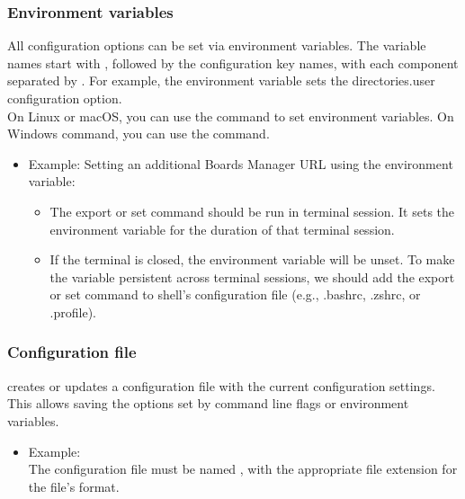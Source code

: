 \subsubsection{Environment variables}
All configuration options can be set via environment variables. The variable names start with , followed by the configuration key names, with each component separated by \SHELL{\_}. For example, the  environment variable sets the directories.user configuration option.
\\On Linux or macOS, you can use the  command to set environment variables. On Windows command, you can use the  command. \cite{ArduinoCLIConfig:2024}
\begin{itemize}
	\item Example:
Setting an additional Boards Manager URL using the  environment variable:
\newline
{}
\newline
{}

	\begin{itemize}
		\item The export or set command should be run in terminal session. It sets the environment variable for the duration of that terminal session.
		\item If the terminal is closed, the environment variable will be unset. To make the variable persistent across terminal sessions, we should add the export or set command to shell's configuration file (e.g., .bashrc, .zshrc, or .profile).
	\end{itemize}
\end{itemize}

\subsubsection{Configuration file}
 creates or updates a configuration file with the current configuration settings.
This allows saving the options set by command line flags or environment variables. \cite{ArduinoCLIConfig:2024}
\begin{itemize}
	\item Example:
\newline
{}
\\The configuration file must be named , with the appropriate file extension for the file's format.
\end{itemize}

